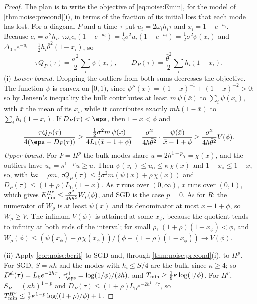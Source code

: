 \begin{refsection}
\begin{proof}
The plan is to write the objective of \eqref{eq:noise:Emin}, for the model of \cref{thm:noise:precond}(i), in terms of the fraction of its initial loss that each mode has lost. For a diagonal $P$ and a time $\tau$ put $u_i=2\omega_ih_i\tau$ and $x_i=1-e^{-u_i}$. Because $c_i=\sigma^2h_i$, $\tau\omega_ic_i(1-e^{-u_i})=\frac12\sigma^2u_i(1-e^{-u_i})=\frac12\sigma^2\psi(x_i)$ and $\Delta_{0,i}e^{-u_i}=\frac12h_i\bar\theta^2(1-x_i)$, so
\[
  \tau Q_P(\tau)=\frac{\sigma^2}2\sum_i\psi(x_i),\qquad D_P(\tau)=\frac{\bar\theta^2}2\sum_ih_i(1-x_i).
\]
(i) \emph{Lower bound.} Dropping the outliers from both sums decreases the objective. The function $\psi$ is convex on $[0,1)$, since $\psi''(x)=(1-x)^{-1}+(1-x)^{-2}>0$; so by Jensen's inequality the bulk contributes at least $m\,\psi(\bar x)$ to $\sum_i\psi(x_i)$, with $\bar x$ the mean of its $x_i$, while it contributes exactly $mh(1-\bar x)$ to $\sum_ih_i(1-x_i)$. If $D_P(\tau)<\eps$, then $1-\bar x<\phi$ and
\[
  \frac{\tau Q_P(\tau)}{4(\eps-D_P(\tau))}\ge\frac{\frac12\sigma^2m\,\psi(\bar x)}{4L_{\mathrm b}(\bar x-1+\phi)}=\frac{\sigma^2}{4h\bar\theta^2}\cdot\frac{\psi(\bar x)}{\bar x-1+\phi}\ge\frac{\sigma^2}{4h\bar\theta^2}V(\phi).
\]
\emph{Upper bound.} For $P=H^p$ the bulk modes share $u=2h^{1-p}\tau=\chi(x)$, and the outliers have $u_{\mathrm o}=\kappa^{1-p}u\ge u$. Then $\psi(x_{\mathrm o})\le u_{\mathrm o}\le\kappa\,\chi(x)$ and $1-x_{\mathrm o}\le1-x$, so, with $k\kappa=\rho m$, $\tau Q_P(\tau)\le\frac12\sigma^2m(\psi(x)+\rho\,\chi(x))$ and $D_P(\tau)\le(1+\rho)L_{\mathrm b}(1-x)$. As $\tau$ runs over $(0,\infty)$, $x$ runs over $(0,1)$, which gives $E_{\min}^{H^p}\le\frac{\sigma^2}{4h\bar\theta^2}W_\rho(\phi)$, and SGD is the case $p=0$. As for $R$: the numerator of $W_\rho$ is at least $\psi(x)$ and its denominator at most $x-1+\phi$, so $W_\rho\ge V$. The infimum $V(\phi)$ is attained at some $x_\phi$, because the quotient tends to infinity at both ends of the interval; for small $\rho$, $(1+\rho)(1-x_\phi)<\phi$, and $W_\rho(\phi)\le(\psi(x_\phi)+\rho\,\chi(x_\phi))/(\phi-(1+\rho)(1-x_\phi))\to V(\phi)$.

(ii) Apply \cref{cor:noise:bcrit} to SGD and, through \cref{thm:noise:precond}(i), to $H^p$. For SGD, $S=\kappa h$ and the modes with $h_i\le S/4$ are the bulk, since $\kappa\ge4$; so $D^{\mathrm{sl}}(\tau)=L_{\mathrm b}e^{-2h\tau}$, $\tau^\noisesl_\eps=\log(1/\phi)/(2h)$, and $T_{\min}\ge\frac18\kappa\log(1/\phi)$. For $H^p$, $S_P=(\kappa h)^{1-p}$ and $D_P(\tau)\le(1+\rho)L_{\mathrm b}e^{-2h^{1-p}\tau}$, so $T_{\min}^{H^p}\le\frac12\kappa^{1-p}\log((1+\rho)/\phi)+1$.
\end{proof}


\end{refsection}

